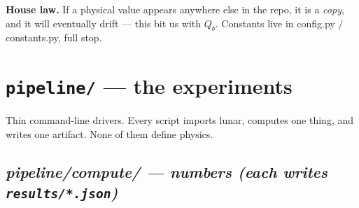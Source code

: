 \documentclass[11pt]{article}
\newcommand{\code}[1]{{\ttfamily\small #1}}
\begin{document}
\begin{housebox}
\textbf{House law.} If a physical value appears anywhere else in the repo, it
is a \emph{copy}, and it will eventually drift --- this bit us with $Q_b$.
Constants live in \code{config.py} / \code{constants.py}, full stop.
\end{housebox}

\section{\texttt{pipeline/} --- the experiments}

Thin command-line drivers. Every script imports \code{lunar}, computes one
thing, and writes one artifact. None of them define physics.

\subsection*{\normalfont\itshape pipeline/compute/ --- numbers (each writes \texttt{results/*.json})}
\end{document}
